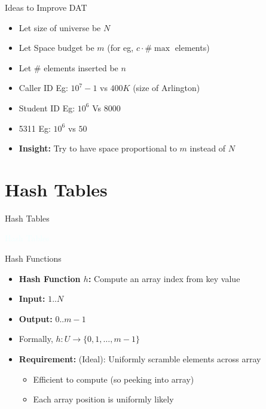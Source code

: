\documentclass{beamer}
\newcommand{\thblue}[1]{{\Huge {\textcolor{azure}{#1}}}}
\begin{document}
\begin{frame}{Ideas to Improve DAT}
    \begin{itemize}
        \item Let size of universe be $N$
        \item Let Space budget be $m$ (for eg, $c \cdot \#\max$ elements)
        \item Let \# elements inserted be $n$ 
        \item Caller ID Eg: $10^7-1$ vs $400K$ (size of Arlington)
        \item Student ID Eg: $10^6$ Vs $8000$ 
        \item 5311 Eg: $10^6$ vs $50$ 
        \item {\bf Insight:} Try to have space proportional to $m$ instead of $N$
    \end{itemize}
\end{frame}


\section{Hash Tables}

\begin{frame}{Hash Tables}
    \begin{center}
        \thblue{Hash Tables}
    \end{center}
\end{frame}

\begin{frame}{Hash Functions}
    \begin{itemize}
        \item {\bf Hash Function $h$:} Compute an array index from key value
        \item {\bf Input:} $1 .. N$
        \item {\bf Output:} $0 .. m-1$ 
        \item Formally, $h : U \rightarrow \{0, 1, \ldots, m-1\}$
        \item {\bf Requirement:} (Ideal): Uniformly scramble elements across array
        \begin{itemize}
            \item Efficient to compute (so peeking into array)
            \item Each array position is uniformly likely
        \end{itemize}
    \end{itemize}
\end{frame}
\end{document}
